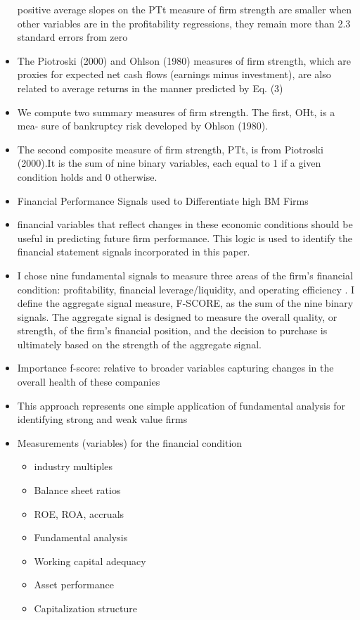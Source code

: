\documentclass[12pt]{article}
\begin{document}
\begin{itemize}
        positive average slopes on the PTt measure of firm strength are smaller when other variables are in the profitability regressions, they remain more than 2.3 standard errors
        from zero \citep{Fama2006}
        \item The Piotroski (2000) and Ohlson (1980) measures of firm strength, which are proxies for expected net cash flows (earnings minus investment), are also related to average returns in the manner predicted by Eq. (3) \citep{Fama2006}
        \item We compute two summary measures of firm strength. The first, OHt, is a mea- sure of bankruptcy risk developed by Ohlson (1980).\citep{Fama2006}
        \item The second composite measure of firm strength, PTt, is from Piotroski (2000).It
        is the sum of nine binary variables, each equal to 1 if a given condition holds and 0 otherwise.\citep{Fama2006}

        \item Financial Performance Signals used to Differentiate high BM Firms \citep{Piotroski2000}
        \item financial variables that reflect changes in these economic conditions should be useful in predicting future firm performance. This logic is used to identify the financial statement signals incorporated in this paper. \citep{Piotroski2000}
        \item I chose nine fundamental signals to measure three areas of the firm's financial condition: profitability, financial leverage/liquidity, and operating efficiency \citep{Piotroski2000}. I define the aggregate signal measure, F-SCORE, as the sum of the nine binary signals. The aggregate signal is designed to measure the overall quality, or strength, of the firm's financial position, and the decision to purchase is ultimately based on the strength of the aggregate signal.
        \item Importance f-score: relative to broader variables capturing changes in the overall health of these companies \citep{Piotroski2000}
        \item This approach represents one simple application of fundamental analysis for identifying strong and weak value firms \citep{Piotroski2000}
        
        \item Measurements (variables) for the financial condition 
    
            \begin{itemize}
            \item industry multiples
            \item Balance sheet ratios
            \item ROE, ROA, accruals 
            \item Fundamental analysis
            \item Working capital adequacy
            \item Asset performance
            \item Capitalization structure
            \end{itemize}
    

\end{itemize}
\end{document}
